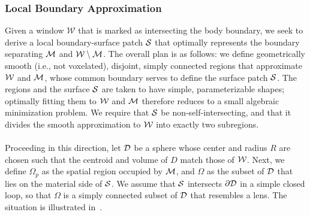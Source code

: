 \subsubsection{Local Boundary Approximation}

Given a window $\mathcal{W}$ that is marked as intersecting the body boundary, we seek to derive a local boundary-surface patch $\mathcal{S}$ that optimally represents the boundary separating $\mathcal{M}$ and $\mathcal{W} \setminus \mathcal{M}$.  The overall plan is as follows: we define geometrically smooth (i.e., not voxelated), disjoint, simply connected regions that approximate $\mathcal{W}$ and $\mathcal{M}$, whose common boundary serves to define the surface patch $\mathcal{S}$.  The regions and the surface $\mathcal{S}$ are taken to have simple, parameterizable shapes; optimally fitting them to $\mathcal{W}$ and $\mathcal{M}$ therefore reduces to a small algebraic minimization problem.  We require that $\mathcal{S}$ be non-self-intersecting, and that it divides the smooth approximation to $\mathcal{W}$ into exactly two subregions. \\ \\
%
Proceeding in this direction, let $\mathcal{D}$ be a sphere whose center and radius $R$ are chosen such that the centroid and volume of $D$ match those of $\mathcal{W}$.  Next, we define $\Omega_p$ as the spatial region occupied by $\mathcal{M}$, and $\Omega$ as the subset of $\mathcal{D}$ that lies on the material side of $\mathcal{S}$.  We assume that $\mathcal{S}$ intersects $\partial \mathcal{D}$ in a simple closed loop, so that $\Omega$ is a simply connected subset of $\mathcal{D}$ that resembles a lens. The situation is illustrated in~. \\ \\
